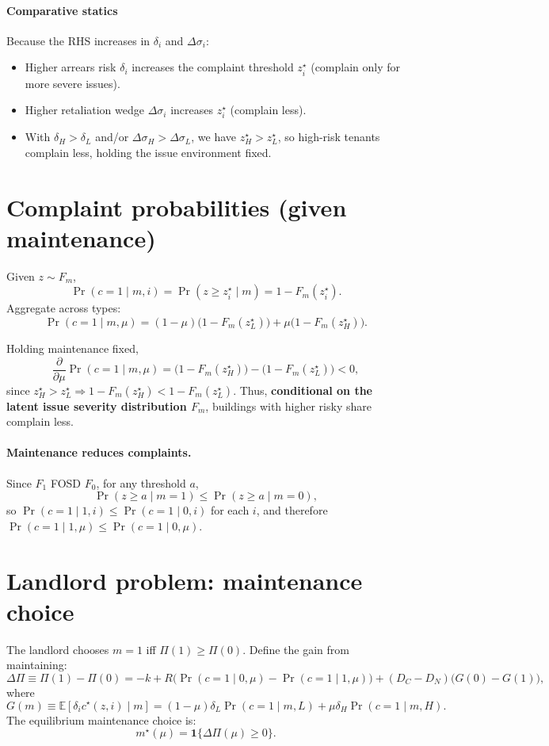 \documentclass[11pt]{article}
\begin{document}
\paragraph{Comparative statics}
Because the RHS increases in $\delta_i$ and $\Delta\sigma_i$:
\begin{itemize}
\item Higher arrears risk $\delta_i$ increases the complaint threshold $z_i^\star$ (complain only for more severe issues).
\item Higher retaliation wedge $\Delta\sigma_i$ increases $z_i^\star$ (complain less).
\item With $\delta_H>\delta_L$ and/or $\Delta\sigma_H>\Delta\sigma_L$, we have $z_H^\star>z_L^\star$, so high-risk tenants complain less, holding the issue environment fixed.
\end{itemize}

\section{Complaint probabilities (given maintenance)}

Given $z\sim F_m$,
\[
\Pr(c=1\mid m,i)=\Pr(z\ge z_i^\star\mid m)=1-F_m(z_i^\star).
\]
Aggregate across types:
\[
\Pr(c=1\mid m,\mu)
=
(1-\mu)\big(1-F_m(z_L^\star)\big)
+\mu\big(1-F_m(z_H^\star)\big).
\]

Holding maintenance fixed,
\[
\frac{\partial}{\partial \mu}\Pr(c=1\mid m,\mu)
=
\big(1-F_m(z_H^\star)\big)-\big(1-F_m(z_L^\star)\big) <0,
\]
since $z_H^\star>z_L^\star\Rightarrow 1-F_m(z_H^\star)<1-F_m(z_L^\star)$.
Thus, \textbf{conditional on the latent issue severity distribution $F_m$}, buildings with higher risky share complain less.

\paragraph{Maintenance reduces complaints.}
Since $F_1$ FOSD $F_0$, for any threshold $a$,
\[
\Pr(z\ge a\mid m=1)\le \Pr(z\ge a\mid m=0),
\]
so $\Pr(c=1\mid 1,i)\le \Pr(c=1\mid 0,i)$ for each $i$, and therefore $\Pr(c=1\mid 1,\mu)\le \Pr(c=1\mid 0,\mu)$.

\section{Landlord problem: maintenance choice}

The landlord chooses $m=1$ iff $\Pi(1)\ge \Pi(0)$. Define the gain from maintaining:
\[
\Delta \Pi \equiv \Pi(1)-\Pi(0)
=
-k
+ R\Big(\Pr(c=1\mid 0,\mu)-\Pr(c=1\mid 1,\mu)\Big)
+ (D_C-D_N)\Big(G(0)-G(1)\Big),
\]
where
\[
G(m)\equiv \mathbb E[\delta_i c^\star(z,i)\mid m]
=
(1-\mu)\delta_L\Pr(c=1\mid m,L)+\mu\delta_H\Pr(c=1\mid m,H).
\]
The equilibrium maintenance choice is:
\[
m^\star(\mu)=\mathbf 1\{\Delta\Pi(\mu)\ge 0\}.
\]
\end{document}
